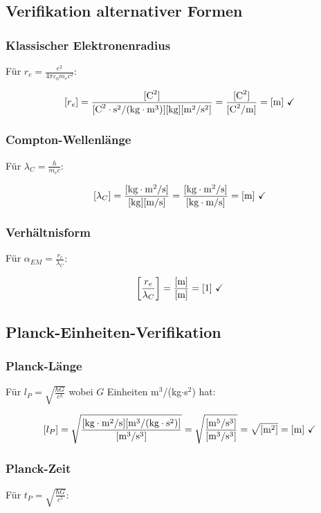 \documentclass[12pt,a4paper]{article}
\begin{document}
	\subsection{Verifikation alternativer Formen}
	
	\subsubsection{Klassischer Elektronenradius}
	Für $r_e = \frac{e^2}{4\pi\varepsilon_0 m_e c^2}$:
	
	$$[r_e] = \frac{[\text{C}^2]}{[\text{C}^2\cdot\text{s}^2/(\text{kg}\cdot\text{m}^3)][\text{kg}][\text{m}^2/\text{s}^2]} = \frac{[\text{C}^2]}{[\text{C}^2/\text{m}]} = [\text{m}] \text{ \checkmark}$$
	
	\subsubsection{Compton-Wellenlänge}
	Für $\lambda_C = \frac{h}{m_e c}$:
	
	$$[\lambda_C] = \frac{[\text{kg}\cdot\text{m}^2/\text{s}]}{[\text{kg}][\text{m/s}]} = \frac{[\text{kg}\cdot\text{m}^2/\text{s}]}{[\text{kg}\cdot\text{m/s}]} = [\text{m}] \text{ \checkmark}$$
	
	\subsubsection{Verhältnisform}
	Für $\alpha_{EM} = \frac{r_e}{\lambda_C}$:
	
	$$\left[\frac{r_e}{\lambda_C}\right] = \frac{[\text{m}]}{[\text{m}]} = [1] \text{ \checkmark}$$
	
	\subsection{Planck-Einheiten-Verifikation}
	
	\subsubsection{Planck-Länge}
	Für $l_P = \sqrt{\frac{\hbar G}{c^3}}$ wobei $G$ Einheiten m$^3$/(kg$\cdot$s$^2$) hat:
	
	$$[l_P] = \sqrt{\frac{[\text{kg}\cdot\text{m}^2/\text{s}][\text{m}^3/(\text{kg}\cdot\text{s}^2)]}{[\text{m}^3/\text{s}^3]}} = \sqrt{\frac{[\text{m}^5/\text{s}^3]}{[\text{m}^3/\text{s}^3]}} = \sqrt{[\text{m}^2]} = [\text{m}] \text{ \checkmark}$$
	
	\subsubsection{Planck-Zeit}
	Für $t_P = \sqrt{\frac{\hbar G}{c^5}}$:
	
\end{document}
